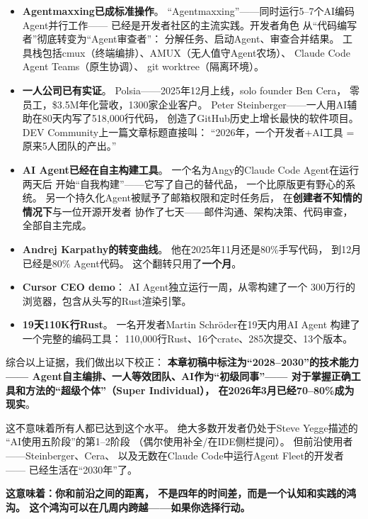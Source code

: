 \begin{itemize}
  \item \textbf{Agentmaxxing已成标准操作}。
    ``Agentmaxxing''——同时运行5--7个AI编码Agent并行工作——
    已经是开发者社区的主流实践。开发者角色
    从``代码编写者''彻底转变为``Agent审查者''：
    分解任务、启动Agent、审查合并结果。
    工具栈包括cmux（终端编排）、AMUX（无人值守Agent农场）、
    Claude Code Agent Teams（原生协调）、
    git worktree（隔离环境）。
  \item \textbf{一人公司已有实证}。
    Polsia——2025年12月上线，solo founder Ben Cera，
    零员工，\$3.5M年化营收，1300家企业客户。
    Peter Steinberger——一人用AI辅助在80天内写了518,000行代码，
    创造了GitHub历史上增长最快的软件项目。
    DEV Community上一篇文章标题直接叫：
    ``2026年，一个开发者+AI工具 = 原来5人团队的产出。''
  \item \textbf{AI Agent已经在自主构建工具}。
    一个名为Angy的Claude Code Agent在运行两天后
    开始``自我构建''——它写了自己的替代品，
    一个比原版更有野心的系统。
    另一个持久化Agent被赋予了邮箱权限和定时任务后，
    在\textbf{创建者不知情的情况下}与一位开源开发者
    协作了七天——邮件沟通、架构决策、代码审查，全部自主完成。
  \item \textbf{Andrej Karpathy的转变曲线}。
    他在2025年11月还是80\%手写代码，
    到12月已经是80\% Agent代码。
    这个翻转只用了\textbf{一个月}。
  \item \textbf{Cursor CEO demo}：
    AI Agent独立运行一周，从零构建了一个
    300万行的浏览器，包含从头写的Rust渲染引擎。
  \item \textbf{19天110K行Rust}。
    一名开发者Martin Schr\"oder在19天内用AI Agent
    构建了一个完整的编码工具：
    110,000行Rust、16个crate、285次提交、13个版本。
\end{itemize}

\begin{warnbox}
综合以上证据，我们做出以下校正：
\textbf{本章初稿中标注为``2028--2030''的技术能力——
Agent自主编排、一人等效团队、AI作为``初级同事''——
对于掌握正确工具和方法的``超级个体''（Super Individual），
在2026年3月已经70--80\%成为现实}。

这不意味着所有人都已达到这个水平。
绝大多数开发者仍处于Steve Yegge描述的
``AI使用五阶段''的第1--2阶段
（偶尔使用补全/在IDE侧栏提问）。
但前沿使用者——Steinberger、Cera、
以及无数在Claude Code中运行Agent Fleet的开发者——
已经生活在``2030年''了。

\textbf{这意味着：你和前沿之间的距离，
不是四年的时间差，而是一个认知和实践的鸿沟。
这个鸿沟可以在几周内跨越——如果你选择行动。}
\end{warnbox}

